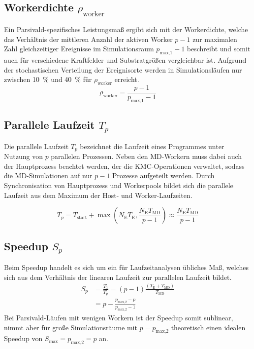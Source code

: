 \subsection{Workerdichte \texorpdfstring{$\rho_\text{worker}$}{rhoworker}}

Ein Parsivald-spezifisches Leistungsmaß ergibt sich mit der Workerdichte, welche das Verhältnis der mittleren Anzahl der aktiven Worker $p-1$ zur maximalen Zahl gleichzeitiger Ereignisse im Simulationsraum $p_\text{max,1}-1$ beschreibt und somit auch für verschiedene Kraftfelder und Substratgrößen vergleichbar ist.
Aufgrund der stochastischen Verteilung der Ereignisorte werden in Simulationsläufen nur zwischen \SI{10}{\percent} und \SI{40}{\percent} für $\rho_\text{worker}$ erreicht.
\begin{equation}
  \rho_\text{worker} = \frac{p - 1}{p_\text{max,1} - 1}
  \label{eq:workerdensity}
\end{equation}

\subsection{Parallele Laufzeit \texorpdfstring{$T_p$}{Tp}}

Die parallele Laufzeit $T_p$ bezeichnet die Laufzeit eines Programmes unter Nutzung von $p$ parallelen Prozessen.
Neben den MD-Workern muss dabei auch der Hauptprozess beachtet werden, der die KMC-Operationen verwaltet, sodass die MD-Simulationen auf nur $p-1$ Prozesse aufgeteilt werden.
Durch Synchronisation von Hauptprozess und Workerpools bildet sich die parallele Laufzeit aus dem Maximum der Host- und Worker-Laufzeiten.

\begin{equation}
  T_p = T_\text{start} + \max\left(N_\text{E} T_\text{E}, \frac{N_\text{E} T_\text{MD}}{p-1}\right) \approx \frac{N_\text{E} T_\text{MD}}{p-1}
  \label{eq:runtime}
\end{equation}

\subsection{Speedup \texorpdfstring{$S_p$}{Sp}}

Beim Speedup handelt es sich um ein für Laufzeitanalysen übliches Maß, welches sich aus dem Verhältnis der linearen Laufzeit zur parallelen Laufzeit bildet.
\begin{align}
  S_p & = \frac{T_1}{T_p} = \left(p-1\right) \frac{\left(T_\text{E} + T_\text{MD}\right)}{T_\text{MD}} \\
      & = p - \frac{p_\text{max,2} - p}{p_\text{max,2} - 1}
\end{align}
Bei Parsivald-Läufen mit wenigen Workern ist der Speedup somit sublinear, nimmt aber für große Simulationsräume mit $p = p_\text{max,2}$ theoretisch einen idealen Speedup von $S_\text{max} = p_\text{max,2} = p$ an.

